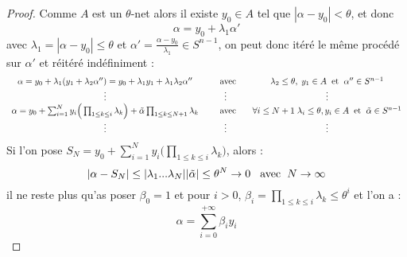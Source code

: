 \documentclass[12pt]{article}
\begin{document}
\begin{proof}
	Comme $A$ est un $\theta$-net alors il existe $y_0\in A$ tel que $|\alpha-y_0|<\theta$, et donc
	\begin{equation*}
		\alpha = y_0 + \lambda_1 \alpha'
	\end{equation*}
	avec $\lambda_1= |\alpha-y_0|\leq \theta$ et $\alpha' = \frac{\alpha-y_0}{\lambda_1}\in S^{n-1}$, on peut donc itéré le même procédé sur $\alpha'$ et réitéré indéfiniment : 
	\begin{equation*}
	\begin{array}{ccc}
		\alpha = y_0 + \lambda_1 (y_1+\lambda_2\alpha'')=y_0+\lambda_1y_1+\lambda_1\lambda_2\alpha'' &\text{\hspace{4mm} avec \hspace{2mm}}&  \lambda_2\leq \theta, \; y_1\in A \text{\hspace{2mm}et\hspace{2mm}} \alpha''\in S^{n-1}\\
		\vdots&\vdots&\vdots\\
		\alpha = y_0 + \sum_{i=1}^{N}y_i\Big(\prod_{1\leq k\leq i}\lambda_k\Big)+\tilde{\alpha}\prod_{1\leq k\leq N+1}\lambda_k &\text{\hspace{4mm} avec \hspace{2mm}}&  \text{$\forall i\leq N+1$\hspace{1mm}} \lambda_i\leq \theta, y_i\in A \text{\hspace{2mm}et\hspace{2mm}} \tilde{\alpha}\in S^{n-1}\\
		\vdots & \vdots & \vdots
	\end{array}
	\end{equation*} 
	Si l'on pose $S_N = y_0 + \sum_{i=1}^{N}y_i\Big(\prod_{1\leq k\leq i}\lambda_k\Big)$, alors :
	\begin{equation*}
		|\alpha-S_N| \leq |\lambda_1 ... \lambda_N| |\tilde{\alpha}|\leq \theta^{N} \to 0  \text{\hspace{3mm}avec\hspace{2mm}}  N\to \infty
	\end{equation*}
	il ne reste plus qu'as poser $\beta_0=1$ et pour $i>0$, $\beta_i=\prod_{1 \leq k\leq i}\lambda_k\leq \theta^i$ et l'on a :
	\begin{equation*}
		\alpha = \sum_{i=0}^{+\infty} \beta_i y_i
	\end{equation*}
\end{proof}
\end{document}
